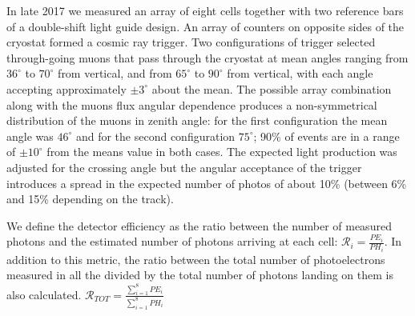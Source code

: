 In late 2017 we measured an array of eight  cells together with two reference bars of a double-shift light guide design. An array of counters on opposite sides of the cryostat formed a cosmic ray trigger. 
Two configurations of trigger selected through-going muons that pass through the cryostat at mean angles ranging from $36^{\circ} $ to $70^{\circ} $ from vertical, and from $65^{\circ} $ to $90^{\circ} $ from vertical, with each angle accepting approximately $\pm 3^{\circ}$ about the mean. The possible array combination along with the muons flux angular dependence produces a non-symmetrical distribution of the muons in zenith angle: for the first configuration the mean angle was $46^{\circ}$ and for the second configuration $75^{\circ}$; 90\% of events are in a range of $\pm 10^{\circ}$ from the means value in both cases.
The expected light production was adjusted for the crossing angle but the angular acceptance of the trigger introduces a spread in the expected number of photos of about 10\% (between 6\% and 15\% depending on the track).


We define the detector efficiency as the ratio between the number of measured photons and the estimated number of photons arriving at each  cell:
$\mathcal{R}_{i}=\frac{PE_i}{PH_i}$.
In addition to this metric, the ratio between the total number of photoelectrons measured in all the  divided by the total number of photons landing on them is also calculated. 
$\mathcal{R}_{TOT}=\frac{\sum_{i=1}^8PE_i}{\sum_{i=1}^8PH_i}$


